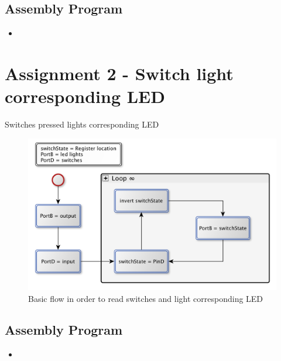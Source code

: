 \documentclass[a4paper, 12pt]{article}
\newcommand{\avrasm}[2]{
\begin{itemize}
\item[]
\end{itemize}
}
\begin{document}


\newpage
\subsection{Assembly Program}
\avrasm{../src/a1.asm}{}
\newpage

\section{Assignment 2 - Switch light corresponding LED}



\begin{algorithm}
\begin{algorithmic}
\Repeat
{} 
\Until{$\infty$}
\EndProcedure
\caption{Switches pressed lights corresponding LED}
\label{assign2.pseudo}
\end{algorithmic}
\end{algorithm}

\begin{figure}[h]
\includegraphics[scale=0.5]{Flowchart_pics/assignment2_pic.png} 
\caption{Basic flow in order to read switches and light corresponding LED}
\label{assign2.flow}
\end{figure}
\newpage



\subsection{Assembly Program}
\avrasm{../src/a2.asm}{}
\newpage
\end{document}
